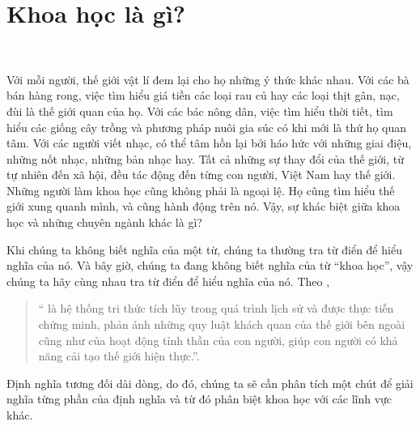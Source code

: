 \chapter{Khoa học là gì?}

\

Với mỗi người, thế giới vật lí đem lại cho họ những ý thức khác nhau. Với các bà bán hàng rong, việc tìm hiểu giá tiền các loại rau củ hay các loại thịt gân, nạc, đùi là thế giới quan của họ. Với các bác nông dân, việc tìm hiểu thời tiết, tìm hiểu các giống cây trồng và phương pháp nuôi gia súc có khi mới là thứ họ quan tâm. Với các người viết nhạc, có thể tâm hồn lại bởi háo hức với những giai điệu, những nốt nhạc, những bản nhạc hay. Tất cả những sự thay đổi của thế giới, từ tự nhiên đến xã hội, đều tác động đến từng con người, Việt Nam hay thế giới. Những người làm khoa học cũng không phải là ngoại lệ. Họ cũng tìm hiểu thế giới xung quanh mình, và cũng hành động trên nó. Vậy, sự khác biệt giữa khoa học và những chuyên ngành khác là gì?

Khi chúng ta không biết nghĩa của một từ, chúng ta thường tra từ điển để hiểu nghĩa của nó. Và bây giờ, chúng ta đang không biết nghĩa của từ ``khoa học'', vậy chúng ta hãy cùng nhau tra từ điển để hiểu nghĩa của nó. Theo \cite{hoangphe2022tudientienviet},
\begin{quotation}
    `` là hệ thống tri thức tích lũy trong quá trình lịch sử và được thực tiễn chứng minh, phản ánh những quy luật khách quan của thế giới bên ngoài cũng như của hoạt động tỉnh thần của con người, giúp con người có khả năng cải tạo thế giới hiện thực.''.
\end{quotation}

Định nghĩa tương đối dài dòng, do đó, chúng ta sẽ cần phân tích một chút để giải nghĩa từng phần của định nghĩa và từ đó phân biệt khoa học với các lĩnh vực khác.








